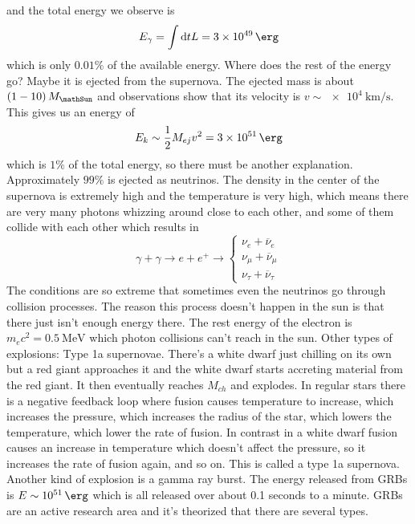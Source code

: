 and the total energy we observe is
\begin{equation}
    E_\gamma = \int \dd t L = \qty{3e49}{\erg}
\end{equation}
which is only \( 0.01\% \) of the available energy. Where does the rest of the energy go? Maybe it is ejected from the supernova. The ejected mass is about \(\ins{1-10}M_\mathSun \) and observations show that its velocity is \(v\sim\qty{e4}{\kilo\meter\per\second}\). This gives us an energy of
\begin{equation}
    E_{k} \sim \frac{1}{2}M_{ej}v^2 = \qty{3e51}{\erg}
\end{equation}
which is \(1\% \) of the total energy, so there must be another explanation. Approximately \(99\% \) is ejected as neutrinos. The density in the center of the supernova is extremely high and the temperature is very high, which means there are very many photons whizzing around close to each other, and some of them collide with each other which results in
\begin{equation}
    \gamma + \gamma \rightarrow e + e^+ \rightarrow \begin{cases}
        \nu_e + \overline{\nu}_e \\
        \nu_\mu + \overline{\nu}_\mu \\
        \nu_\tau + \overline{\nu}_\tau
    \end{cases}
\end{equation}
The conditions are so extreme that sometimes even the neutrinos go through collision processes. The reason this process doesn't happen in the sun is that there just isn't enough energy there. The rest energy of the electron is \(m_{e}c^2 = \qty{0.5}{\mega\electronvolt}\) which photon collisions can't reach in the sun. Other types of explosions: Type 1a supernovae. There's a white dwarf just chilling on its own but a red giant approaches it and the white dwarf starts accreting material from the red giant. It then eventually reaches \(M_{ch}\) and explodes. In regular stars there is a negative feedback loop where fusion causes temperature to increase, which increases the pressure, which increases the radius of the star, which lowers the temperature, which lower the rate of fusion. In contrast in a white dwarf fusion causes an increase in temperature which doesn't affect the pressure, so it increases the rate of fusion again, and so on. This is called a type 1a supernova. Another kind of explosion is a gamma ray burst. The energy released from GRBs is \(E\sim\qty{e51}{\erg}\) which is all released over about 0.1 seconds to a minute. GRBs are an active research area and it's theorized that there are several types.